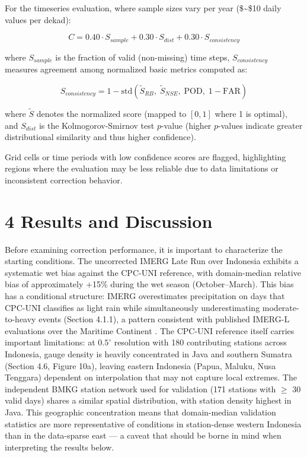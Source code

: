 \documentclass[
]{article}
\begin{document}
For the timeseries evaluation, where sample sizes vary per year
(\$\sim\$10 daily values per dekad):

\[C = 0.40 \cdot S_{sample} + 0.30 \cdot S_{dist} + 0.30 \cdot S_{consistency}\]

where \(S_{sample}\) is the fraction of valid (non-missing) time steps,
\(S_{consistency}\) measures agreement among normalized basic metrics
computed as:

\[S_{consistency} = 1 - \text{std}\left(\tilde{S}_{RB}, \; \tilde{S}_{NSE}, \; \text{POD}, \; 1 - \text{FAR}\right)\]

where \(\tilde{S}\) denotes the normalized score (mapped to \([0, 1]\)
where 1 is optimal), and \(S_{dist}\) is the Kolmogorov-Smirnov test
\(p\)-value (higher \(p\)-values indicate greater distributional
similarity and thus higher confidence).

Grid cells or time periods with low confidence scores are flagged,
highlighting regions where the evaluation may be less reliable due to
data limitations or inconsistent correction behavior.

\section{4 Results and Discussion}\label{results-and-discussion}

Before examining correction performance, it is important to characterize
the starting conditions. The uncorrected IMERG Late Run over Indonesia
exhibits a systematic wet bias against the CPC-UNI reference, with
domain-median relative bias of approximately +15\% during the wet season
(October--March). This bias has a conditional structure: IMERG
overestimates precipitation on days that CPC-UNI classifies as light
rain while simultaneously underestimating moderate-to-heavy events
(Section 4.1.1), a pattern consistent with published IMERG-L evaluations
over the Maritime Continent \cite{ref31,ref32,ref33}. The CPC-UNI reference itself
carries important limitations: at \(0.5^{\circ}\) resolution with 180
contributing stations across Indonesia, gauge density is heavily
concentrated in Java and southern Sumatra (Section 4.6, Figure 10a),
leaving eastern Indonesia (Papua, Maluku, Nusa Tenggara) dependent on
interpolation that may not capture local extremes. The independent BMKG
station network used for validation (171 stations with \(\geq\) 30 valid
days) shares a similar spatial distribution, with station density
highest in Java. This geographic concentration means that domain-median
validation statistics are more representative of conditions in
station-dense western Indonesia than in the data-sparse east --- a
caveat that should be borne in mind when interpreting the results below.
\end{document}
